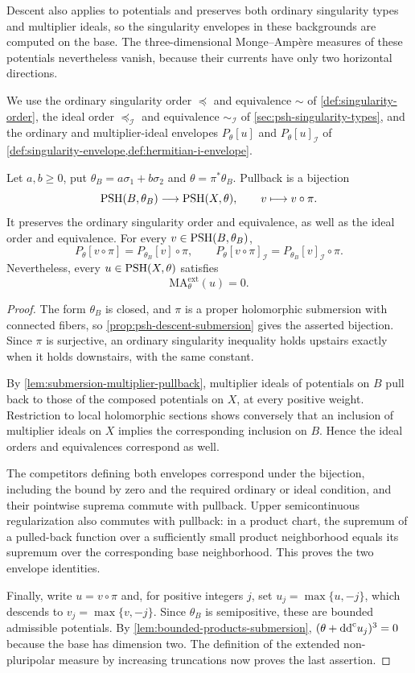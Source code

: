 Descent also applies to potentials and preserves both ordinary singularity types and multiplier ideals, so the singularity envelopes in these backgrounds are computed on the base. The three-dimensional Monge--Amp\`ere measures of these potentials nevertheless vanish, because their currents have only two horizontal directions.

We use the ordinary singularity order $\preceq$ and equivalence $\sim$ of \cref{def:singularity-order}, the ideal order $\preceq_{\mathcal I}$ and equivalence $\sim_{\mathcal I}$ of \cref{sec:psh-singularity-types}, and the ordinary and multiplier-ideal envelopes $P_\theta[u]$ and $P_\theta[u]_{\mathcal I}$ of \cref{def:singularity-envelope,def:hermitian-i-envelope}.

\begin{proposition}\label{prop:elliptic-potential-descent}
Let $a,b\geq0$, put $\theta_B=a\sigma_1+b\sigma_2$ and $\theta=\pi^*\theta_B$. Pullback is a bijection
\[
 \mathrm{PSH}(B,\theta_B)\longrightarrow\mathrm{PSH}(X,\theta),\qquad v\longmapsto v\circ\pi.
\]
It preserves the ordinary singularity order and equivalence, as well as the ideal order and equivalence. For every $v\in\mathrm{PSH}(B,\theta_B)$,
\[
 P_\theta[v\circ\pi]=P_{\theta_B}[v]\circ\pi,
 \qquad P_\theta[v\circ\pi]_{\mathcal I}=P_{\theta_B}[v]_{\mathcal I}\circ\pi.
\]
Nevertheless, every $u\in\mathrm{PSH}(X,\theta)$ satisfies
\[
 \mathrm{MA}^{\mathrm{ext}}_\theta(u)=0.
\]
\end{proposition}
\begin{proof}
The form $\theta_B$ is closed, and $\pi$ is a proper holomorphic submersion with connected fibers, so \cref{prop:psh-descent-submersion} gives the asserted bijection. Since $\pi$ is surjective, an ordinary singularity inequality holds upstairs exactly when it holds downstairs, with the same constant.

By \cref{lem:submersion-multiplier-pullback}, multiplier ideals of potentials on $B$ pull back to those of the composed potentials on $X$, at every positive weight. Restriction to local holomorphic sections shows conversely that an inclusion of multiplier ideals on $X$ implies the corresponding inclusion on $B$. Hence the ideal orders and equivalences correspond as well.

The competitors defining both envelopes correspond under the bijection, including the bound by zero and the required ordinary or ideal condition, and their pointwise suprema commute with pullback. Upper semicontinuous regularization also commutes with pullback: in a product chart, the supremum of a pulled-back function over a sufficiently small product neighborhood equals its supremum over the corresponding base neighborhood. This proves the two envelope identities.

Finally, write $u=v\circ\pi$ and, for positive integers $j$, set $u_j=\max\{u,-j\}$, which descends to $v_j=\max\{v,-j\}$. Since $\theta_B$ is semipositive, these are bounded admissible potentials. By \cref{lem:bounded-products-submersion}, $(\theta+\mathrm{dd}^{\mathrm{c}} u_j)^3=0$ because the base has dimension two. The definition of the extended non-pluripolar measure by increasing truncations now proves the last assertion.
\end{proof}

